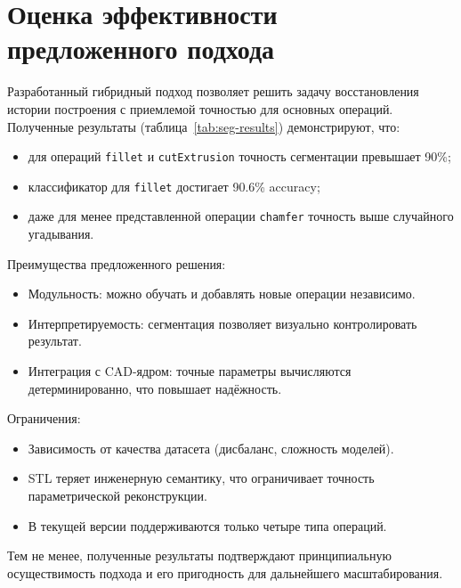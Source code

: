 \section{Оценка эффективности предложенного подхода}

Разработанный гибридный подход позволяет решить задачу восстановления истории построения с приемлемой точностью для основных операций. Полученные результаты (таблица~\ref{tab:seg-results}) демонстрируют, что:
\begin{itemize}
    \item для операций \texttt{fillet} и \texttt{cutExtrusion} точность сегментации превышает 90\%;
    \item классификатор для \texttt{fillet} достигает 90.6\% accuracy;
    \item даже для менее представленной операции \texttt{chamfer} точность выше случайного угадывания.
\end{itemize}

Преимущества предложенного решения:
\begin{itemize}
    \item Модульность: можно обучать и добавлять новые операции независимо.
    \item Интерпретируемость: сегментация позволяет визуально контролировать результат.
    \item Интеграция с CAD-ядром: точные параметры вычисляются детерминированно, что повышает надёжность.
\end{itemize}

Ограничения:
\begin{itemize}
    \item Зависимость от качества датасета (дисбаланс, сложность моделей).
    \item STL теряет инженерную семантику, что ограничивает точность параметрической реконструкции.
    \item В текущей версии поддерживаются только четыре типа операций.
\end{itemize}

Тем не менее, полученные результаты подтверждают принципиальную осуществимость подхода и его пригодность для дальнейшего масштабирования.

